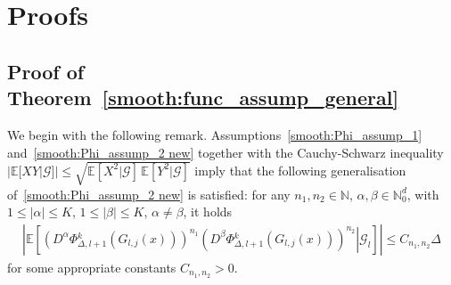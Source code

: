 \documentclass[11pt,a4paper]{amsart}
\theoremstyle{plain}
\theoremstyle{definition}
\theoremstyle{remark}
\numberwithin{equation}{section}
\newcommand*{\EE}{\mathbb E}
\newcommand*{\NN}{\mathbb{N}}
\newcommand*{\cG}{\mathcal G}
\begin{document}
\section{Proofs}
\label{sec:proofs}
\subsection*{Proof of Theorem~\protect\ref{smooth:func_assump_general}}
We begin with the following remark.
Assumptions~\eqref{smooth:Phi_assump_1}
and~\eqref{smooth:Phi_assump_2 new}
together with the Cauchy-Schwarz inequality
$|\EE[XY|\cG]|\le\sqrt{\EE[X^2|\cG]\,\EE[Y^2|\cG]}$
imply that the following generalisation
of~\eqref{smooth:Phi_assump_2 new} is satisfied:
for any $n_1,n_2\in\NN$, $\alpha,\beta\in\NN_0^d$,
with
$1\le\left|\alpha\right|\le K$,
$1\le\left|\beta\right|\le K$,
$\alpha\ne\beta$,
it holds
\begin{align}
\label{smooth:Phi_assump_2}
\left|\EE\left[\left.\left(D^{\alpha}\Phi{}_{\Delta,l+1}^{k}(G_{l,j}(x))\right)^{n_1}\left(D^{\beta}\Phi{}_{\Delta,l+1}^{k}(G_{l,j}(x))\right)^{n_2}\right|\mathcal{G}_{l}\right]\right|\leq C_{n_1,n_2}\Delta
\end{align}
for some appropriate constants $C_{n_1,n_2}>0$.
\end{document}
